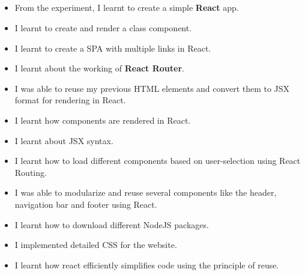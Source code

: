 \documentclass[12pt, a4]{article}
\begin{document}
\newpage
\subsection*{}
\begin{itemize}

\item From the experiment, I learnt to create a simple \textbf{React} app.
\item I learnt to create and render a class component.
\item I learnt to create a SPA with multiple links in React.
\item I learnt about the working of \textbf{React Router}.
\item I was able to reuse my previous HTML elements and convert them to JSX format for rendering in React.
\item I learnt how components are rendered in React.
\item I learnt about JSX syntax.
\item I learnt how to load different components based on user-selection using React Routing.
\item I was able to modularize and reuse several components like the header, navigation bar and footer using React.
\item I learnt how to download different NodeJS packages.
\item I implemented detailed CSS for the website.
\item I learnt how react efficiently simplifies code using the principle of reuse.

\end{itemize}
\end{document}
